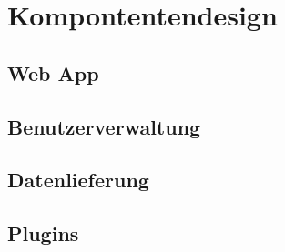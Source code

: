 \chapter{Kompontentendesign}

\section{Web App}

\section{Benutzerverwaltung}

\section{Datenlieferung}

\section{Plugins}

